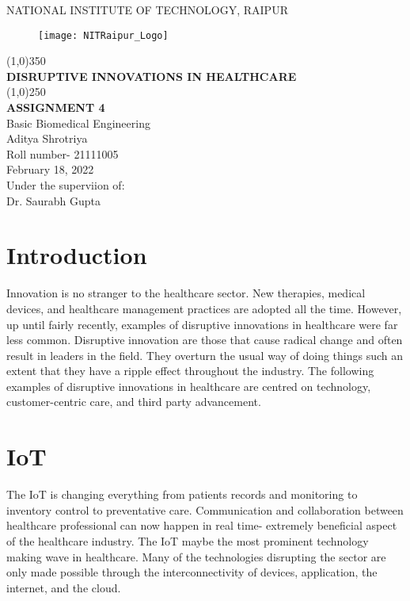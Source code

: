 \documentclass[12pt]{article}
\begin{document}
\begin{titlepage}
\begin{center}

\large{NATIONAL INSTITUTE OF TECHNOLOGY, RAIPUR}\\
[1.5mm]
\begin{figure}[h]
\centering
\texttt{[image: NITRaipur\_Logo]}
\end{figure}
\line(1,0){350}\\
[0.25in]
\huge{\bfseries DISRUPTIVE INNOVATIONS IN HEALTHCARE}\\
[2mm]
\line(1,0){250}\\
[0.25in]
\large{\bfseries ASSIGNMENT 4}\\
{Basic Biomedical Engineering}\\
[0.75cm]
\large{Aditya Shrotriya}\\
{Roll number- 21111005}\\
{February 18, 2022}\\
[1cm]
\large{Under the superviion of:}\\
{Dr. Saurabh Gupta}

\end{center}
\end{titlepage}
\clearpage 
\tableofcontents
\clearpage

\section{Introduction}

Innovation is no stranger to the healthcare sector. New therapies, medical devices, and healthcare management practices are adopted all the time. However, up until fairly recently, examples of disruptive innovations in healthcare were far less common. Disruptive innovation are those that cause radical change and often result in leaders in the field. They overturn the usual way of doing things such an extent that they have a ripple effect throughout the industry. The following examples of disruptive innovations in healthcare are centred on technology, customer-centric care, and third party advancement.

\section{IoT}

The IoT is changing everything from patients records and monitoring to inventory control to preventative care. Communication and collaboration between healthcare professional can now happen in real time- extremely beneficial aspect of the healthcare industry. The IoT maybe the most prominent technology making wave in healthcare. Many of the technologies disrupting the sector are only made possible through the interconnectivity of devices, application, the internet, and the cloud.
\end{document}
